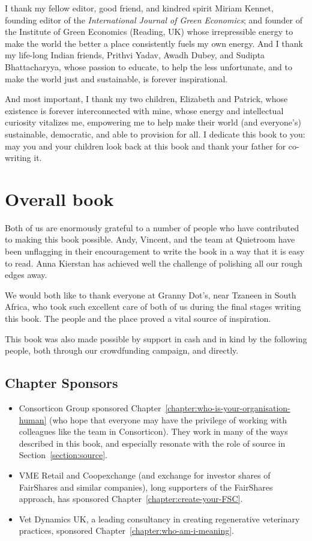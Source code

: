 I thank my fellow editor, good friend, and kindred spirit Miriam Kennet, founding editor of the \emph{International Journal of Green Economics}; and founder of the Institute  of Green Economics (Reading, UK) whose irrepressible energy to make the world the better a place consistently fuels my own energy.  And I thank my life-long Indian friends, Prithvi Yadav, Awadh Dubey, and Sudipta Bhattacharyya, whose  passion to educate, to help the less unfortunate, and to make the world just and sustainable, is forever inspirational. 


And most important, I thank my two children, Elizabeth and Patrick, whose existence is forever interconnected with mine, whose energy and intellectual curiosity vitalizes me, empowering me to help make their world (and everyone’s) sustainable, democratic, and able to provision for all. I dedicate this book to you: may you and your children look back at this book and thank your father for co-writing it.  




\section*{Overall book}
Both of us are enormously grateful to a number of people who have contributed to making this book possible. Andy, Vincent, and the team at Quietroom have been unflagging in their encouragement to write the book in a way that it is easy to read. Anna Kierstan has achieved well the challenge of polishing all our rough edges away. 


We would both like to thank everyone at Granny Dot’s, near Tzaneen in South Africa, who took such excellent care of both of us during the final stages writing this book. The people and the place proved a vital source of inspiration.


This book was also made possible by support in cash and in kind by the following people, both through our crowdfunding campaign, and directly.


\clearpage


\subsection{Chapter Sponsors}
\begin{itemize}
\item Consorticon Group sponsored Chapter~\ref{chapter:who-is-your-organisation-human} (who hope that everyone may have the privilege of working with colleagues like the team in Consorticon). They  work in many of the ways described in this book, and especially resonate with the role of source in Section~\ref{section:source}.  
\item VME Retail and Coopexchange (and exchange for investor shares of FairShares and similar companies), long supporters of the FairShares approach, has sponsored Chapter~\ref{chapter:create-your-FSC}.
\item Vet Dynamics UK, a leading consultancy in creating regenerative veterinary practices, sponsored Chapter~\ref{chapter:who-am-i-meaning}.
\end{itemize}
